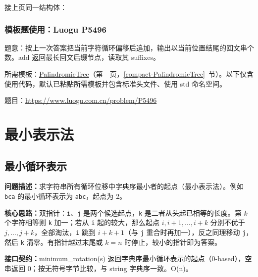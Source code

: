 \noindent 接上页同一结构体：



\Needspace{337pt}

\subsection*{模板题使用：Luogu P5496}

\label{usage-example-20}

题意：按上一次答案把当前字符循环偏移后追加，输出以当前位置结尾的回文串个数。add 返回最长回文后缀节点，读取其 suffixes。

所需模板：\hyperref[compact-PalindromicTree]{PalindromicTree}（第~\pageref{compact-PalindromicTree}~页，\ref{compact-PalindromicTree}~节）。以下仅含使用代码，默认已粘贴所需模板并包含标准头文件、使用 std 命名空间。

题目：\url{https://www.luogu.com.cn/problem/P5496}



\Needspace{496pt}

\chapter{最小表示法}

\section{最小循环表示}\label{compact-minimum_rotation}

\noindent\textbf{问题描述：}\allowbreak 求字符串所有循环位移中字典序最小者的起点（最小表示法）。例如 \texttt{bca} 的最小循环表示为 \texttt{abc}，起点为 2。

\textbf{核心思路：}\allowbreak 双指针：\texttt{i}、\texttt{j} 是两个候选起点，\texttt{k} 是二者从头起已相等的长度。第 $k$ 个字符相等则 \texttt{k} 加一；若从 \texttt{i} 起的较大，那么起点 $i,i+1,\dots,i+k$ 分别不优于 $j,\dots,j+k$，全部淘汰，\texttt{i} 跳到 $i+k+1$（与 \texttt{j} 重合时再加一），反之同理移动 \texttt{j}，然后 \texttt{k} 清零。有指针越过末尾或 $k=n$ 时停止，较小的指针即为答案。



{\sloppy{}\noindent\textbf{接口契约：}minimum\_rotation(s) 返回字典序最小循环表示的起点（0-based），空串返回 0；按无符号字节比较，与 string 字典序一致。O(n)。\par}

